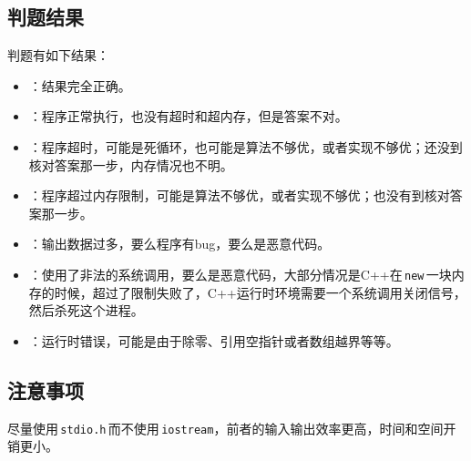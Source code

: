 \documentclass[10pt, a4paper, oneside, fontset=none]{ctexart}
\theoremstyle{plain}
\theoremstyle{definition}
\begin{document}
\subsection{判题结果}
判题有如下结果：
\begin{itemize}
    \item {}：结果完全正确。
    \item {}：程序正常执行，也没有超时和超内存，但是答案不对。
    \item {}：程序超时，可能是死循环，也可能是算法不够优，或者实现不够优；还没到核对答案那一步，内存情况也不明。
    \item {}：程序超过内存限制，可能是算法不够优，或者实现不够优；也没有到核对答案那一步。
    \item {}：输出数据过多，要么程序有bug，要么是恶意代码。
    \item {}：使用了非法的系统调用，要么是恶意代码，大部分情况是C++在\,\lstinline{new}\,一块内存的时候，超过了限制失败了，C++运行时环境需要一个系统调用关闭信号，然后杀死这个进程。
    \item {}：运行时错误，可能是由于除零、引用空指针或者数组越界等等。
\end{itemize}

\subsection{注意事项}

尽量使用\,\lstinline{stdio.h}\,而不使用\,\lstinline{iostream}，前者的输入输出效率更高，时间和空间开销更小。
\end{document}
